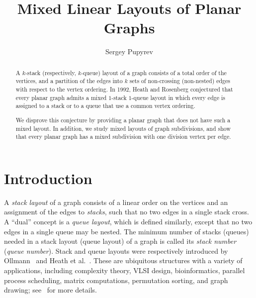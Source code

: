 \documentclass[orivec]{llncs}
\newcommand{\df}[1]{{\it #1}}
\begin{document}
    
\title{Mixed Linear Layouts of Planar Graphs}

\author{
    Sergey Pupyrev
}


\date{}
\maketitle

\begin{abstract}
    A $k$-stack (respectively, $k$-queue) layout of a graph consists of a total order of the vertices, and a partition
    of the edges into $k$ sets of non-crossing (non-nested) edges with respect to the vertex ordering.
    In 1992, Heath and Rosenberg conjectured that every planar graph admits a mixed $1$-stack $1$-queue layout in which
    every edge is assigned to a stack or to a queue that use a common vertex ordering.
    
    We disprove this conjecture by providing a planar graph that does not have such a mixed layout.
    In addition, we study mixed layouts of graph subdivisions, and show that every planar graph has a mixed
    subdivision with one division vertex per edge.
\end{abstract}

\section{Introduction}

A \df{stack layout} of a graph consists of a linear order on the vertices and an assignment of the
edges to \df{stacks}, such that no two edges in a single stack cross. A ``dual'' concept is
a \df{queue layout}, which is defined similarly, except that no two edges in a single queue may
be nested. The minimum number of stacks (queues) needed in a stack layout (queue layout) of a graph
is called its \df{stack number} (\df{queue number}). Stack and queue layouts were respectively introduced by 
Ollmann~\cite{Oll73} and Heath et al.~\cite{HR92,HLR92}. These are ubiquitous structures with a variety of applications, 
including complexity theory, VLSI design, bioinformatics, parallel process
scheduling, matrix computations, permutation sorting, and graph drawing; see~\cite{DW04} for more details.
\end{document}
